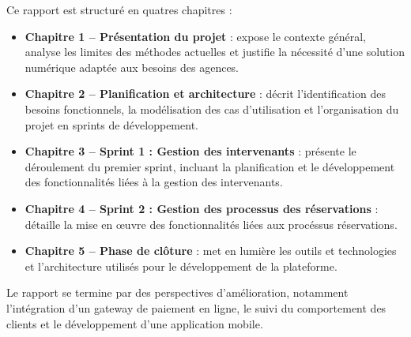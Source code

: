 Ce rapport est structuré en quatres chapitres :
\begin{itemize}
    \item \textbf{Chapitre 1 – Présentation du projet} : expose le contexte général, analyse les limites des méthodes actuelles et justifie la nécessité d’une solution numérique adaptée aux besoins des agences.
    \item \textbf{Chapitre 2 – Planification et architecture} : décrit l’identification des besoins fonctionnels, la modélisation des cas d’utilisation et l’organisation du projet en sprints de développement.
    \item \textbf{Chapitre 3 – Sprint 1 : Gestion des intervenants} : présente le déroulement du premier sprint, incluant la planification et le développement des fonctionnalités liées à la gestion des intervenants.
    \item \textbf{Chapitre 4 – Sprint 2 : Gestion des processus des réservations} : détaille la mise en œuvre des fonctionnalités liées aux procéssus réservations.
    \item \textbf{Chapitre 5 – Phase de clôture} : met en lumière les outils et technologies et l'architecture utilisés pour le développement de la plateforme.
\end{itemize}

Le rapport se termine par des perspectives d'amélioration, notamment l'intégration d'un gateway de paiement en ligne, le suivi du comportement des clients et le développement d'une application mobile.



